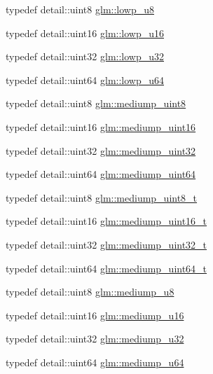 \begin{CompactItemize}
\item 
typedef detail::uint8 \hyperlink{group__gtc__type__precision_ge63f942c49a30dbf266b2f13f3efe257}{glm::lowp\_\-u8}
\item 
typedef detail::uint16 \hyperlink{group__gtc__type__precision_g22c5364f27caa0a6eb0627cbc21e46be}{glm::lowp\_\-u16}
\item 
typedef detail::uint32 \hyperlink{group__gtc__type__precision_gba06fae1dd98ca50c017e68345df0365}{glm::lowp\_\-u32}
\item 
typedef detail::uint64 \hyperlink{group__gtc__type__precision_g61ed4c68a4cffb77cd63cc107119123a}{glm::lowp\_\-u64}
\item 
typedef detail::uint8 \hyperlink{group__gtc__type__precision_gc4b849eaac0543a10f97f4bdda4850a8}{glm::mediump\_\-uint8}
\item 
typedef detail::uint16 \hyperlink{group__gtc__type__precision_g2cef3a0d7b0fce75c9885f64656d8933}{glm::mediump\_\-uint16}
\item 
typedef detail::uint32 \hyperlink{group__gtc__type__precision_g861dbd1051f488e425b3966001b568e5}{glm::mediump\_\-uint32}
\item 
typedef detail::uint64 \hyperlink{group__gtc__type__precision_g6685788d15d0a973ee7c2460d0456dc1}{glm::mediump\_\-uint64}
\item 
typedef detail::uint8 \hyperlink{group__gtc__type__precision_gdfa38f3c245d371c4b2079f1fd68928b}{glm::mediump\_\-uint8\_\-t}
\item 
typedef detail::uint16 \hyperlink{group__gtc__type__precision_g0b385466deac5ac96061ef2cdd6db20f}{glm::mediump\_\-uint16\_\-t}
\item 
typedef detail::uint32 \hyperlink{group__gtc__type__precision_gc7782c1e393f9ad47e41a177a685f287}{glm::mediump\_\-uint32\_\-t}
\item 
typedef detail::uint64 \hyperlink{group__gtc__type__precision_ga97354d3120a6dc029a5e9563723de18}{glm::mediump\_\-uint64\_\-t}
\item 
typedef detail::uint8 \hyperlink{group__gtc__type__precision_gc04b372784392e82bd557f300c4de097}{glm::mediump\_\-u8}
\item 
typedef detail::uint16 \hyperlink{group__gtc__type__precision_g6745262ef6a6fdb8637b2387ef924828}{glm::mediump\_\-u16}
\item 
typedef detail::uint32 \hyperlink{group__gtc__type__precision_gd0c27a525045c299a92306eb4cd7c13a}{glm::mediump\_\-u32}
\item 
typedef detail::uint64 \hyperlink{group__gtc__type__precision_g00c51a16fa190b0a90205d50d6d8a44a}{glm::mediump\_\-u64}

\end{CompactItemize}
